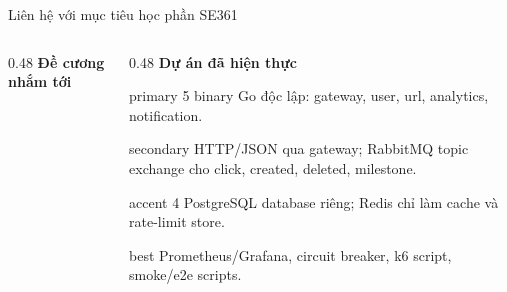 \documentclass[aspectratio=169]{beamer}
\begin{document}
\begin{frame}{Liên hệ với mục tiêu học phần SE361}
    \begin{columns}[T,onlytextwidth]
        \begin{column}{0.48\textwidth}
            \textbf{Đề cương nhắm tới}
            \vspace{0.2cm}
        \end{column}
        \begin{column}{0.48\textwidth}
            \textbf{Dự án đã hiện thực}
            \vspace{0.2cm}
            \begin{claimbox}{primary}
                \small 5 binary Go độc lập: gateway, user, url, analytics, notification.
            \end{claimbox}
            \begin{claimbox}{secondary}
                \small HTTP/JSON qua gateway; RabbitMQ topic exchange cho click, created, deleted, milestone.
            \end{claimbox}
            \begin{claimbox}{accent}
                \small 4 PostgreSQL database riêng; Redis chỉ làm cache và rate-limit store.
            \end{claimbox}
            \begin{claimbox}{best}
                \small Prometheus/Grafana, circuit breaker, k6 script, smoke/e2e scripts.
            \end{claimbox}
        \end{column}
    \end{columns}
\end{frame}
\end{document}
